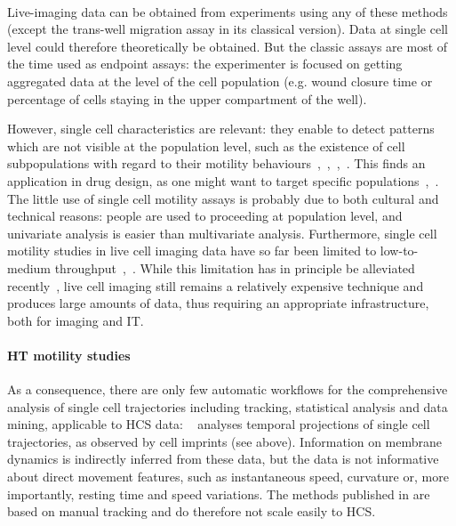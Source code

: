 \paragraph*{}
Live-imaging data can be obtained from experiments using any of these methods (except the trans-well migration assay in its classical version). Data at single cell level could therefore theoretically be obtained. But the classic assays are most of the time used as endpoint assays: the experimenter is focused on getting aggregated data at the level of the cell population (e.g. wound closure time or percentage of cells staying in the upper compartment of the well).

However, single cell characteristics are relevant: they enable to detect patterns which are not visible at the population level, such as the existence of cell subpopulations with regard to their motility behaviours~\cite{pmid24324630},~\cite{pmid25129619},~\cite{pmid25799384},~\cite{motiw}. This finds an application in drug design, as one might want to target specific populations~\cite{pmid15539606},~\cite{pmid20461076}. The little use of single cell motility assays is probably due to both cultural and technical reasons: people are used to proceeding at population level, and univariate analysis is easier than multivariate analysis. Furthermore, single cell motility studies in live cell imaging data have so far been limited to low-to-medium throughput~\cite{pmid21423205},~\cite{pmid25799384}. While this limitation has in principle be alleviated recently~\cite{pmid20360735}, live cell imaging still remains a relatively expensive technique and produces large amounts of data, thus requiring an appropriate infrastructure, both for imaging and IT. 

\paragraph*{HT motility studies}
As a consequence, there are only few automatic workflows for the comprehensive analysis of single cell trajectories including tracking, statistical analysis and data mining, applicable to HCS data: ~\cite{pmid25774502} analyses temporal projections of single cell trajectories, as observed by cell imprints (see above). Information on membrane dynamics is indirectly inferred from these data, but the data is not informative about direct movement features, such as instantaneous speed, curvature or, more importantly, resting time and speed variations. The methods published in \cite{pmid24324630} are based on manual tracking and do therefore not scale easily to HCS. 

